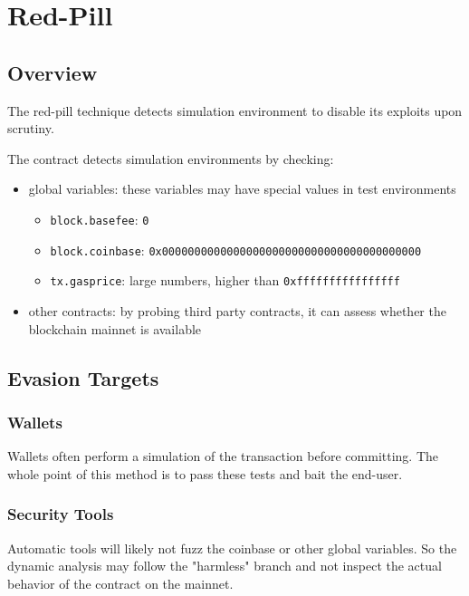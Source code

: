 \section{Red-Pill} \label{sec:red-pill}

\subsection{Overview}

The red-pill technique detects simulation environment to disable its exploits upon scrutiny. 

The contract detects simulation environments by checking:

\begin{itemize}
\item{global variables: these variables may have special values in test environments
\begin{itemize}
    \item{\lstinline[language=Solidity]{block.basefee}: \lstinline{0}}
    \item{\lstinline[language=Solidity]{block.coinbase}: \lstinline{0x0000000000000000000000000000000000000000}}
    \item{\lstinline[language=Solidity]{tx.gasprice}: large numbers, higher than \lstinline{0xffffffffffffffff}}
\end{itemize}}
\item{other contracts: by probing third party contracts, it can assess whether the blockchain mainnet is available}
\end{itemize}

\subsection{Evasion Targets}

\subsubsection{Wallets}

Wallets often perform a simulation of the transaction before committing.
The whole point of this method is to pass these tests and bait the end-user.

\subsubsection{Security Tools}

Automatic tools will likely not fuzz the coinbase or other global variables.
So the dynamic analysis may follow the "harmless" branch and not inspect the actual behavior of the contract on the mainnet.

